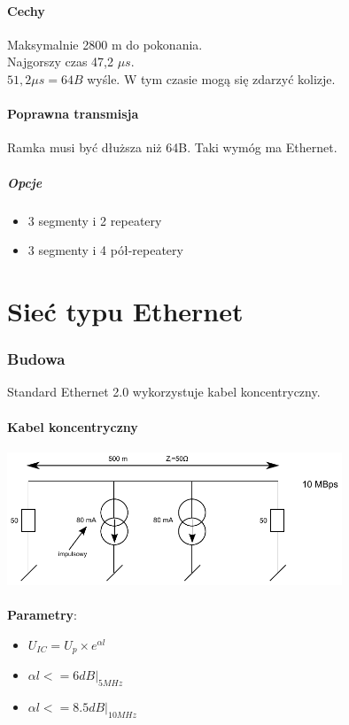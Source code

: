 \documentclass[a4paper,twoside]{article}
\begin{document}
\subsection{Cechy}
Maksymalnie 2800 m do pokonania.\\
Najgorszy czas 47,2 $ \mu s $.\\
$ 51,2 \mu s=64B $ wyśle. W tym czasie mogą się zdarzyć kolizje.
\subsection{Poprawna transmisja}
Ramka musi być dłuższa niż 64B. Taki wymóg ma Ethernet.
\subsubsection{Opcje}
\begin{itemize}
	\item 3 segmenty i 2 repeatery
	\item 3 segmenty i 4 pół-repeatery
\end{itemize}


\part{Sieć typu Ethernet}
\section{Budowa}
	Standard Ethernet 2.0 wykorzystuje kabel koncentryczny.
	\subsection{Kabel koncentryczny}
		\includegraphics[width=10cm]{./images/image27.pdf}\\\\
		\textbf{Parametry}:
		\begin{itemize}
			\item $ U_{IC}=U_{p}\times e^{\alpha{l}} $
			\item $ \alpha{l} <= 6 dB|_{5 MHz} $
			\item $ \alpha{l} <= 8.5 dB|_{10 MHz} $
		\end{itemize}
\end{document}
